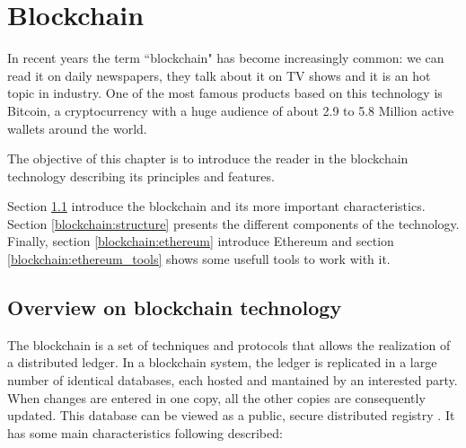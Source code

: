 \chapter{Blockchain}
\label{blockchain}

In recent years the term ``blockchain" has become increasingly common: we can read it on daily newspapers, they talk about 
it on TV shows and it is an hot topic in industry. One of the most famous products based on this technology is Bitcoin, a 
cryptocurrency with a huge audience of about 2.9 to 5.8 Million active wallets \cite{BitcoinStatisticsCambridge} around the 
world.

The objective of this chapter is to introduce the reader in the blockchain technology describing its principles and features.

Section \ref{blockchain:overview} introduce the blockchain and its more important characteristics. Section 
\ref{blockchain:structure} presents the different components of the technology. Finally, section \ref{blockchain:ethereum} 
introduce Ethereum and section \ref{blockchain:ethereum_tools} shows some usefull tools to work with it.


\section{Overview on blockchain technology}
\label{blockchain:overview}
The blockchain is a set of techniques and protocols that allows the realization of a distributed ledger. In a blockchain 
system, the ledger is replicated in a large number of identical databases, each hosted and mantained by an interested party. 
When changes are entered in one copy, all the other copies are consequently updated. This database can be viewed as a public, 
secure distributed registry \cite{TruthAboutBlockchain}. It has some main characteristics following described:

